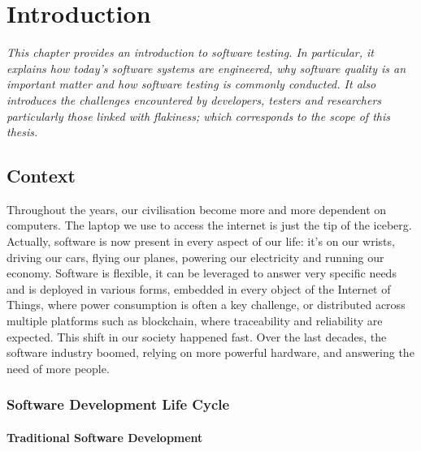 \chapter{Introduction}
\label{chap:introduction}
\setcounter{minitocdepth}{1}
\justifying
\textit{
This chapter provides an introduction to software testing. In particular, it explains how today's software systems are engineered, why software quality is an important matter and how software testing is commonly conducted. It also introduces the challenges encountered by developers, testers and researchers particularly those linked with flakiness; which corresponds to the scope of this thesis.
}


\chapterPage{
}


\section{Context}

Throughout the years, our civilisation become more and more dependent on computers. The laptop we use to access the internet is just the tip of the iceberg. Actually, software is now present in every aspect of our life: it's on our wrists, driving our cars, flying our planes, powering our electricity and running our economy. Software is flexible, it can be leveraged to answer very specific needs and is deployed in various forms, \eg embedded in every object of the Internet of Things, where power consumption is often a key challenge, or distributed across multiple platforms such as blockchain, where traceability and reliability are expected. This shift in our society happened fast. Over the last decades, the software industry boomed, relying on more powerful hardware, and answering the need of more people. 

\subsection{Software Development Life Cycle}

\subsubsection{Traditional Software Development}

